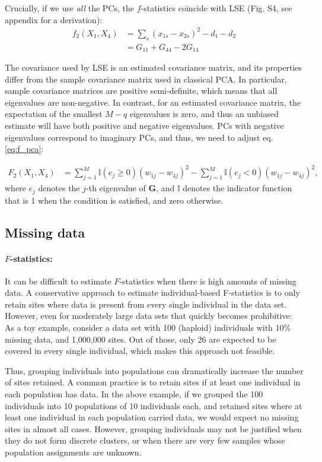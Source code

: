 \documentclass[12pt, letterpaper]{article}
\begin{document}
Crucially, if we use \emph{all} the PCs, the $f$-statistics coincide with LSE (Fig. S4, see appendix for a derivation): 
\begin{align}
    f_2(X_1, X_4) &= \sum_s (x_{1s} - x_{2s})^2 - d_1 - d_2 \nonumber\\
    &= G_{11} + G_{44} - 2 G_{14} \label{eq:lse}
\end{align}

The covariance used by LSE is an estimated covariance matrix, and its properties differ from the sample covariance matrix used in classical PCA. In particular, sample covariance matrices are positive semi-definite, which means that all eigenvalues are non-negative. In contrast, for an estimated covariance matrix, the expectation of the smallest $M-q$ eigenvalues is zero, and thus an unbiased estimate will have both positive and negative eigenvalues. PCs with negative eigenvalues correspond to imaginary PCs, and thus, we need to adjust eq. \ref{eq:f_pca}:


\begin{align}\label{eq:f_lse}
F_2(X_1,X_4) &= \sum_{j=1}^{M}\mathbb{I}(e_j \geq 0) (w_{1j} - w_{4j})^2 - \sum_{j=1}^M \mathbb{I}(e_j <0) (w_{1j} - w_{4j})^2,
\end{align}
where $e_j$ denotes the $j$-th eigenvalue of $\mathbf{G}$, and $\mathbb{I}$ denotes the indicator function that is 1 when the condition is satisfied, and zero otherwise.


\subsection{Missing data}

\paragraph{$F$-statistics:}
It can be difficult to estimate $F$-statistics when there is high amounts of missing data. A conservative approach to estimate individual-based F-statistics is to only retain sites where data is present from every single individual in the data set. However, even for moderately large data sets that quickly becomes prohibitive: As a toy example, consider a data set with 100 (haploid) individuals with 10\% missing data, and 1,000,000 sites. Out of those, only 26 are expected to be covered in every single individual, which makes this approach not feasible.

Thus, grouping individuals into populations can dramatically increase the number of sites retained. A common practice is to retain sites if at least one individual in each population has data. In the above example, if we grouped the 100 individuals into 10 populations of 10 individuals each, and retained sites where at least one individual in each population carried data, we would expect no missing sites in almost all cases. However, grouping individuals may not be justified when they do not form discrete clusters, or when there are very few samples whose population assignments are unknown.
\end{document}
